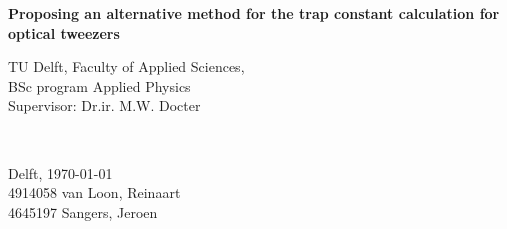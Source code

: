 \begin{titlepage}

\newcommand{\HRule}{\rule{\linewidth}{0.5mm}} %

\center


{ \huge \bfseries Proposing an alternative method for the trap constant calculation for optical tweezers }\\[1cm] %






\vfill
\begin{minipage}{0.4\textwidth}
    \begin{flushleft}
        TU Delft, Faculty of Applied Sciences,\\
        BSc program Applied Physics \\
        Supervisor: Dr.ir.  M.W. Docter
    \end{flushleft}
\end{minipage}
~
\begin{minipage}{0.4\textwidth}
    \begin{flushright}
        Delft, \today \\
        4914058 \hspace{1cm} van Loon, Reinaart\\
        4645197 \hspace{1cm} Sangers, Jeroen
        
    \end{flushright}
\end{minipage}\\[1.5cm]


\end{titlepage}
